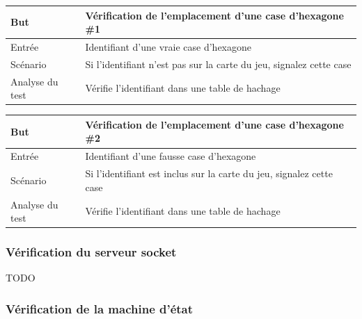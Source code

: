\begin{center}
    \centering
    \begin{tabular}[h]{|m{4cm}|m{12cm}|} 
        \hline
        \rowcolor[HTML]{F8B400}
        \textbf{But} & Vérification de l'emplacement d'une case d'hexagone \#1\\
        \hline
        \hline
        \rowcolor[HTML]{F7F7F7}
        Entrée & Identifiant d'une vraie case d'hexagone \\
        \hline
        \rowcolor[HTML]{F7F7F7}
        Scénario & Si l'identifiant n'est pas sur la carte du jeu, signalez cette case\\
        \hline
        \rowcolor[HTML]{F7F7F7}
        Analyse du test & Vérifie l'identifiant dans une table de hachage \\
        \hline
    \end{tabular}
\end{center}

\begin{center}
    \centering
    \begin{tabular}[h]{|m{4cm}|m{12cm}|} 
        \hline
        \rowcolor[HTML]{F8B400}
        \textbf{But} & Vérification de l'emplacement d'une case d'hexagone \#2\\
        \hline
        \hline
        \rowcolor[HTML]{F7F7F7}
        Entrée & Identifiant d'une fausse case d'hexagone \\
        \hline
        \rowcolor[HTML]{F7F7F7}
        Scénario & Si l'identifiant est inclus sur la carte du jeu, signalez cette case\\
        \hline
        \rowcolor[HTML]{F7F7F7}
        Analyse du test & Vérifie l'identifiant dans une table de hachage \\
        \hline
    \end{tabular}
\end{center}

\subsubsection{Vérification du serveur socket}

TODO

\subsubsection{Vérification de la machine d'état}

